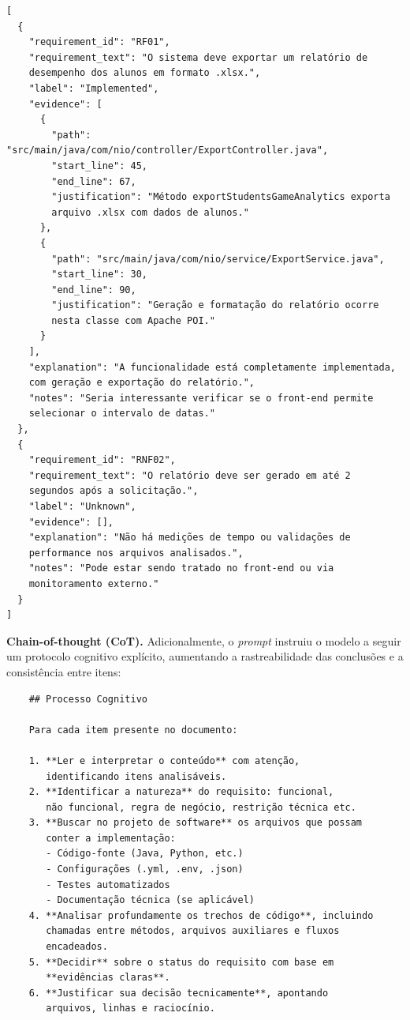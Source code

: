 \begin{verbatim}
[
  {
    "requirement_id": "RF01",
    "requirement_text": "O sistema deve exportar um relatório de 
    desempenho dos alunos em formato .xlsx.",
    "label": "Implemented",
    "evidence": [
      {
        "path": "src/main/java/com/nio/controller/ExportController.java",
        "start_line": 45,
        "end_line": 67,
        "justification": "Método exportStudentsGameAnalytics exporta 
        arquivo .xlsx com dados de alunos."
      },
      {
        "path": "src/main/java/com/nio/service/ExportService.java",
        "start_line": 30,
        "end_line": 90,
        "justification": "Geração e formatação do relatório ocorre 
        nesta classe com Apache POI."
      }
    ],
    "explanation": "A funcionalidade está completamente implementada, 
    com geração e exportação do relatório.",
    "notes": "Seria interessante verificar se o front-end permite 
    selecionar o intervalo de datas."
  },
  {
    "requirement_id": "RNF02",
    "requirement_text": "O relatório deve ser gerado em até 2 
    segundos após a solicitação.",
    "label": "Unknown",
    "evidence": [],
    "explanation": "Não há medições de tempo ou validações de 
    performance nos arquivos analisados.",
    "notes": "Pode estar sendo tratado no front-end ou via 
    monitoramento externo."
  }
]
\end{verbatim}

\textbf{Chain-of-thought (CoT).}
Adicionalmente, o \textit{prompt} instruiu o modelo a seguir um protocolo cognitivo explícito, aumentando a rastreabilidade das conclusões e a consistência entre itens:

\begin{verbatim}
    ## Processo Cognitivo
    
    Para cada item presente no documento:
    
    1. **Ler e interpretar o conteúdo** com atenção, 
       identificando itens analisáveis.
    2. **Identificar a natureza** do requisito: funcional, 
       não funcional, regra de negócio, restrição técnica etc.
    3. **Buscar no projeto de software** os arquivos que possam 
       conter a implementação:
       - Código-fonte (Java, Python, etc.)
       - Configurações (.yml, .env, .json)
       - Testes automatizados
       - Documentação técnica (se aplicável)
    4. **Analisar profundamente os trechos de código**, incluindo 
       chamadas entre métodos, arquivos auxiliares e fluxos 
       encadeados.
    5. **Decidir** sobre o status do requisito com base em 
       **evidências claras**.
    6. **Justificar sua decisão tecnicamente**, apontando 
       arquivos, linhas e raciocínio.
\end{verbatim}

